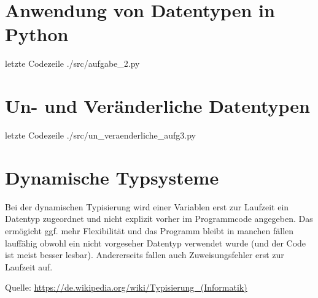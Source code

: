\section{Anwendung von Datentypen in Python}
 letzte Codezeile
{./src/aufgabe_2.py}

\section{Un- und Veränderliche Datentypen}
 letzte Codezeile
{./src/un_veraenderliche_aufg3.py}

\section{Dynamische Typsysteme}
Bei der dynamischen Typisierung wird einer Variablen erst zur Laufzeit ein Datentyp zugeordnet und nicht explizit vorher im Programmcode angegeben. Das ermögicht ggf. mehr Flexibilität und das Programm bleibt in manchen fällen lauffähig obwohl ein nicht vorgeseher Datentyp verwendet wurde (und der Code ist meist besser lesbar). Andererseits fallen auch Zuweisungsfehler erst zur Laufzeit auf.

Quelle: \url{https://de.wikipedia.org/wiki/Typisierung_(Informatik)}


